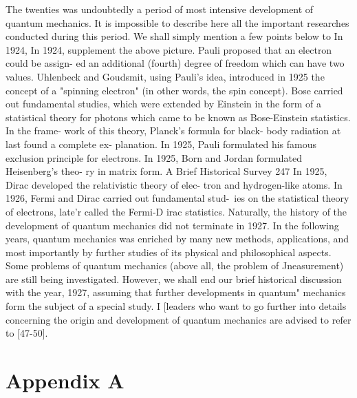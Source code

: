 \documentclass[a4paper,sfsidenotes,colorlinks=true]{tufte-book}
\numberwithin{equation}{section}
\numberwithin{figure}{section}
\begin{document}
{{{{{{The twenties was undoubtedly a period of most intensive development of quantum mechanics. It is impossible to describe here all the important researches conducted during this period. We shall simply mention a few points
below to In 1924,
In 1924,
supplement the above picture. Pauli proposed that an electron could be assign- ed an additional (fourth) degree of freedom which can have two values. Uhlenbeck and Goudsmit, using Pauli's idea, introduced in 1925 the concept of a "spinning electron" (in other words, the spin concept). Bose carried out fundamental studies, which were extended by Einstein in the form of a statistical theory for photons which came to be known as Bose-Einstein statistics. In the frame- work of this theory, Planck's formula for black- body radiation at last found a complete ex-
planation. In 1925, Pauli formulated his famous exclusion principle
for electrons. In 1925, Born and Jordan formulated Heisenberg's theo-
ry in matrix form.
A Brief Historical Survey
247
In 1925, Dirac developed the relativistic theory of elec- tron and hydrogen-like atoms.
In 1926, Fermi and Dirac carried out fundamental stud-\ ies on the statistical theory of electrons, late'r
called	the	Fermi-D irac	statistics. Naturally, the history of the development of quantum mechanics did not terminate in 1927. In the following years, quantum mechanics was enriched by many new methods, applications, and most importantly by further studies of its physical and philosophical aspects. Some problems of quantum mechanics (above all, the problem of Jneasurement) are still being investigated. However,
we shall end our brief historical discussion with the year, 1927, assuming that further developments in quantum" mechanics form the subject of a special study.	I [leaders who want to go further into details concerning the origin and development of quantum mechanics are advised to refer to [47-50].

\chapter{Appendix A} 
\label{appendix-a}

}}}}}}
\end{document}

